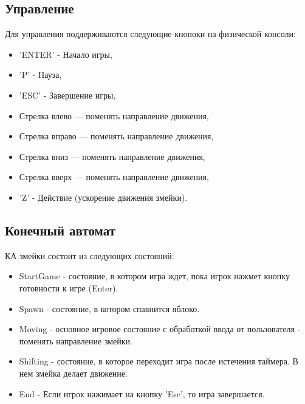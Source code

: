 \documentclass{article}
\begin{document}
\subsection{Управление}
Для управления поддерживаются следующие кнопоки на физической консоли:
\begin{itemize}
    \item 'ENTER' - Начало игры,
    \item 'P' - Пауза,
    \item 'ESC' - Завершение игры,
    \item Стрелка влево — поменять направление движения,
    \item Стрелка вправо — поменять направление движения,
    \item Стрелка вниз — поменять направление движения,
    \item Стрелка вверх — поменять направление движения,
    \item 'Z' - Действие (ускорение движения змейки).

\end{itemize}

\subsection{Конечный автомат}
КА змейки состоит из следующих состояний:
\begin{itemize}
    \item StartGame - состояние, в котором игра ждет, пока игрок нажмет кнопку готовности к игре (Enter).
    \item Spawn - состояние, в котором спавнится яблоко.
    \item Moving - основное игровое состояние с обработкой ввода от пользователя - поменять направление змейки.
    \item Shifting - состояние, в которое переходит игра после истечения таймера. В нем змейка делает движение.
    \item End - Если игрок нажимает на кнопку 'Esc', то игра завершается.
\end{itemize}
\end{document}
